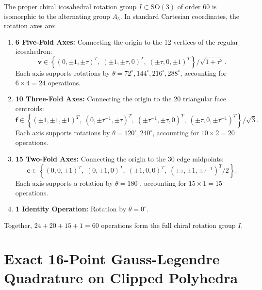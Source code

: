 \documentclass[11pt,a4paper]{article}
\theoremstyle{definition}
\newcommand{\SO}{\mathrm{SO}}
\begin{document}
The proper chiral icosahedral rotation group $I \subset \SO(3)$ of order 60 is isomorphic to the alternating group $A_5$. In standard Cartesian coordinates, the rotation axes are:
\begin{enumerate}
    \item \textbf{6 Five-Fold Axes:} Connecting the origin to the 12 vertices of the regular icosahedron:
    \begin{equation}
    \mathbf{v} \in \left\{ (0, \pm 1, \pm \tau)^T, \; (\pm 1, \pm \tau, 0)^T, \; (\pm \tau, 0, \pm 1)^T \right\} / \sqrt{1+\tau^2}.
    \end{equation}
    Each axis supports rotations by $\theta = 72^\circ, 144^\circ, 216^\circ, 288^\circ$, accounting for $6 \times 4 = 24$ operations.
    \item \textbf{10 Three-Fold Axes:} Connecting the origin to the 20 triangular face centroids:
    \begin{equation}
    \mathbf{f} \in \left\{ (\pm 1, \pm 1, \pm 1)^T, \; (0, \pm \tau^{-1}, \pm \tau)^T, \; (\pm \tau^{-1}, \pm \tau, 0)^T, \; (\pm \tau, 0, \pm \tau^{-1})^T \right\} / \sqrt{3}.
    \end{equation}
    Each axis supports rotations by $\theta = 120^\circ, 240^\circ$, accounting for $10 \times 2 = 20$ operations.
    \item \textbf{15 Two-Fold Axes:} Connecting the origin to the 30 edge midpoints:
    \begin{equation}
    \mathbf{e} \in \left\{ (0, 0, \pm 1)^T, \; (0, \pm 1, 0)^T, \; (\pm 1, 0, 0)^T, \; (\pm \tau, \pm 1, \pm \tau^{-1})^T / 2 \right\}.
    \end{equation}
    Each axis supports a rotation by $\theta = 180^\circ$, accounting for $15 \times 1 = 15$ operations.
    \item \textbf{1 Identity Operation:} Rotation by $\theta = 0^\circ$.
\end{enumerate}
Together, $24 + 20 + 15 + 1 = 60$ operations form the full chiral rotation group $I$.

\section{Exact 16-Point Gauss-Legendre Quadrature on Clipped Polyhedra}
\label{app:gauss_legendre}
\end{document}
